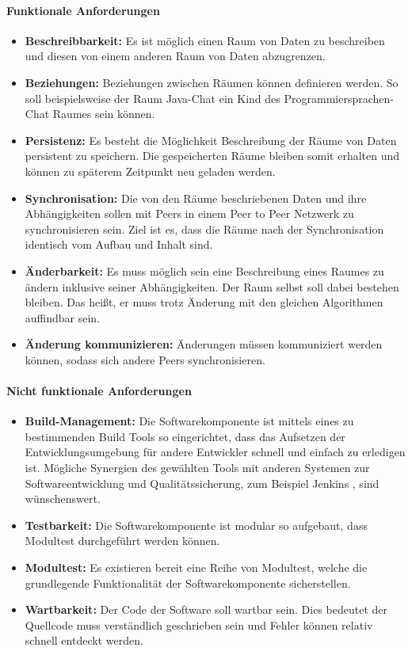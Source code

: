 \documentclass[a4paper]{article}
\begin{document}
	\paragraph{Funktionale Anforderungen}
	\begin{itemize}
		\item \textbf{Beschreibbarkeit:} Es ist möglich einen Raum von
		Daten zu beschreiben und diesen von einem anderen Raum
		von Daten abzugrenzen. 
		\item \textbf{Beziehungen:} Beziehungen zwischen Räumen können 
		definieren werden. So soll beispielsweise der Raum Java-Chat ein 
		Kind des Programmiersprachen-Chat Raumes sein können.
		\item \textbf{Persistenz:} Es besteht die Möglichkeit Beschreibung der
		Räume von Daten persistent zu speichern. Die gespeicherten Räume
		bleiben somit erhalten und können zu späterem Zeitpunkt neu
		geladen werden.
		\item \textbf{Synchronisation:} Die von den Räume beschriebenen Daten 
		und ihre Abhängigkeiten sollen mit Peers in einem Peer to Peer Netzwerk 
		zu synchronisieren sein. Ziel ist es, dass die Räume nach der 
		Synchronisation identisch vom Aufbau und Inhalt sind.
		\item \textbf{Änderbarkeit:} Es muss möglich sein eine Beschreibung
		eines Raumes zu ändern inklusive seiner Abhängigkeiten. Der Raum
		selbst soll dabei bestehen bleiben. Das heißt, er muss trotz Änderung
		mit den gleichen Algorithmen auffindbar sein.
		\item \textbf{Änderung kommunizieren:} Änderungen müssen
		kommuniziert werden können, sodass sich andere Peers synchronisieren.
	\end{itemize} 	
	
	\paragraph{Nicht funktionale Anforderungen}
	\begin{itemize}
		\item \textbf{Build-Management:} Die Softwarekomponente ist mittels
		eines zu bestimmenden Build Tools so eingerichtet, dass das Aufsetzen 
		der	Entwicklungsumgebung für andere Entwickler schnell und einfach
		zu erledigen ist. Mögliche Synergien des gewählten Tools mit anderen
		Systemen zur Softwareentwicklung und Qualitätssicherung, zum Beispiel  
		Jenkins \cite{Jenkins}, sind wünschenswert.
		\item \textbf{Testbarkeit:} Die Softwarekomponente
		ist modular so aufgebaut, dass Modultest durchgeführt werden können.
		\item \textbf{Modultest:} Es existieren bereit eine Reihe von
		Modultest, welche die grundlegende Funktionalität der 
		Softwarekomponente sicherstellen.
		\item \textbf{Wartbarkeit:} Der Code der Software soll wartbar sein.
		Dies bedeutet der Quellcode muss verständlich geschrieben sein und Fehler
		können relativ schnell entdeckt werden.
	\end{itemize} 
	
\end{document}
